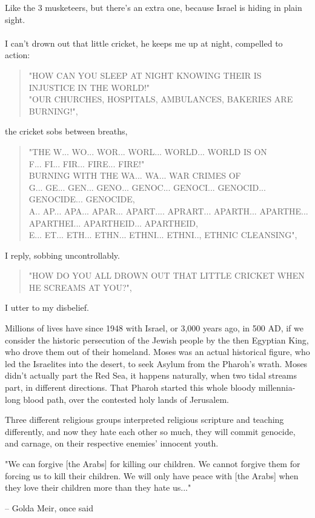 \documentclass[16pt,openany,oneside]{book}
\begin{document}
Like the 3 musketeers, but there's an extra one, because Israel is hiding in plain sight.
\\\\
I can't drown out that little cricket, he keeps me up at night, compelled to action:

\begin{quote}
    "HOW CAN YOU SLEEP AT NIGHT KNOWING THEIR IS INJUSTICE IN THE WORLD!" \\
    "OUR CHURCHES, HOSPITALS, AMBULANCES, BAKERIES ARE BURNING!", 
\end{quote}
    
the cricket sobs between breaths,
\begin{quote}
    "THE W... WO... WOR... WORL... WORLD... WORLD IS ON \\
     F... FI... FIR... FIRE... FIRE!" \\
     BURNING WITH THE WA... WA... WAR CRIMES OF  \\
     G... GE... GEN... GENO... GENOC... GENOCI... GENOCID... GENOCIDE... GENOCIDE,  \\
     A.. AP... APA... APAR... APART.... APRART... APARTH... APARTHE... APARTHEI... APARTHEID... APARTHEID,  \\
     E... ET... ETH... ETHN... ETHNI... ETHNI.., ETHNIC CLEANSING",
\end{quote}
     
I reply, sobbing uncontrollably.
\begin{quote}
    "HOW DO YOU ALL DROWN OUT THAT LITTLE CRICKET WHEN HE SCREAMS AT YOU?",
\end{quote}
I utter to my disbelief.

Millions of lives have since 1948 with Israel, or 3,000 years ago, in 500 AD, if we consider the historic persecution of the Jewish people by the then Egyptian King, who drove them out of their homeland. Moses was an actual historical figure, who led the Israelites into the desert, to seek Asylum from the Pharoh's wrath. Moses didn't actually part the Red Sea, it happens naturally, when two tidal streams part, in different directions. That Pharoh started this whole bloody millennia-long blood path, over the contested holy lands of Jerusalem.

Three different religious groups interpreted religious scripture and teaching differently, and now they hate each other so much, they will commit genocide, and carnage, on their respective enemies' innocent youth.

\epigraph{
  "We can forgive [the Arabs] for killing our children. We cannot forgive them for forcing us to kill their children. We will only have peace with [the Arabs] when they love their children more than they hate us..."
}{-- Golda Meir, once said \cite{meir2014hollywood}}
\end{document}
